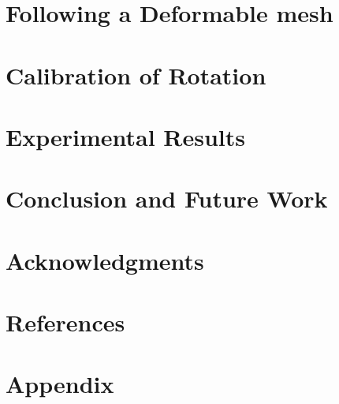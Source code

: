 \documentclass[11pt,psfig]{article}
\begin{document}
\section*{Following a Deformable mesh}

\section*{Calibration of Rotation}

\section*{Experimental Results}

\section*{Conclusion and Future Work}

\section*{Acknowledgments}

\section*{References}

\section*{Appendix}


\end{document}
